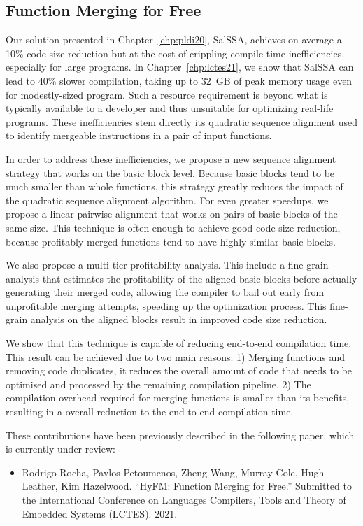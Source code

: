 \subsection{Function Merging for Free}


Our solution presented in Chapter~\ref{chp:pldi20}, SalSSA, achieves on average a 10\% code size reduction but at the cost of crippling compile-time inefficiencies, especially for large programs.
In Chapter~\ref{chp:lctes21}, we show that SalSSA can lead to 40\% slower compilation, taking up to 32~GB of peak memory usage even for modestly-sized program.
Such a resource requirement is beyond what is typically available to a developer and thus unsuitable for optimizing real-life programs.
These inefficiencies stem directly its quadratic sequence alignment used to identify mergeable instructions in a pair of input functions.

In order to address these inefficiencies, we propose a new sequence alignment strategy that works on the basic block level.
Because basic blocks tend to  be much smaller than whole functions, this strategy greatly reduces the impact of the quadratic sequence alignment algorithm.
For even greater speedups, we propose a linear pairwise alignment that works on pairs of basic blocks of the same size. 
This technique is often enough to achieve good code size reduction, because profitably merged functions tend to have highly similar basic blocks.

We also propose a multi-tier profitability analysis.
This include a fine-grain analysis that estimates the profitability of the aligned basic blocks before actually generating their merged code,
allowing the compiler to bail out early from unprofitable merging attempts, speeding up the optimization process.
This fine-grain analysis on the aligned blocks result in improved code size reduction.

We show that this technique is capable of reducing end-to-end compilation time.
This result can be achieved due to two main reasons:
1) Merging functions and removing code duplicates, it reduces the overall amount of code that needs to be optimised and processed by the remaining compilation pipeline.
2) The compilation overhead required for merging functions is smaller than its benefits, resulting in a overall reduction to the end-to-end compilation time.

These contributions have been previously described in the following paper, which is currently under review:
\begin{itemize}
\item Rodrigo Rocha, Pavlos Petoumenos, Zheng Wang, Murray Cole, Hugh Leather, Kim Hazelwood. ``HyFM: Function Merging for Free.'' Submitted to the International Conference on Languages Compilers, Tools and Theory of Embedded Systems (LCTES). 2021.
\end{itemize}

